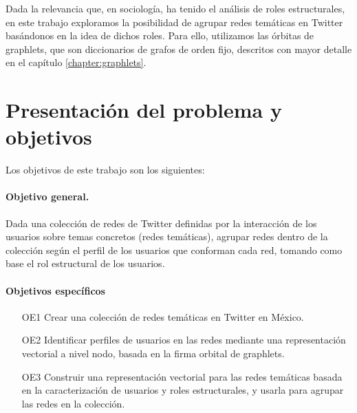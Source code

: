 Dada la relevancia que, en sociología, ha tenido el análisis de roles estructurales, en este trabajo exploramos la posibilidad de agrupar redes temáticas en Twitter basándonos en la idea de dichos roles. Para ello, utilizamos las órbitas de graphlets, que son diccionarios de grafos de orden fijo, descritos con mayor detalle en el capítulo \ref{chapter:graphlets}.

\section{Presentación del problema y objetivos}
\label{sec:intro:motivación}

Los objetivos de este trabajo son los siguientes: 

\paragraph{Objetivo general.}
Dada una colección de redes de Twitter definidas por la interacción de los usuarios sobre temas concretos (redes temáticas), agrupar redes dentro de la colección según el perfil de los usuarios que conforman cada red, tomando como base el rol estructural de los usuarios.

\paragraph{Objetivos específicos}


\begin{itemize}
    \item[OE1] Crear una colección de redes temáticas en Twitter en México.
    \item[OE2] Identificar perfiles de usuarios en las redes mediante una representación vectorial a nivel nodo, basada en la firma orbital de graphlets. 
    \item[OE3] Construir una representación vectorial para las redes temáticas basada en la caracterización de usuarios y roles estructurales, y usarla para agrupar las redes en la colección.
\end{itemize}

